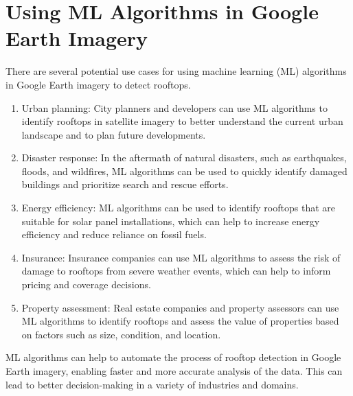 \section{Using ML Algorithms in Google Earth Imagery}
There are several potential use cases for using machine learning (ML) algorithms in Google Earth imagery to detect rooftops.
\begin{enumerate}
    \item Urban planning: City planners and developers can use ML algorithms to identify rooftops in satellite imagery to better understand the current urban landscape and to plan future developments.
    \item Disaster response: In the aftermath of natural disasters, such as earthquakes, floods, and wildfires, ML algorithms can be used to quickly identify damaged buildings and prioritize search and rescue efforts.
    \item Energy efficiency: ML algorithms can be used to identify rooftops that are suitable for solar panel installations, which can help to increase energy efficiency and reduce reliance on fossil fuels.
    \item Insurance: Insurance companies can use ML algorithms to assess the risk of damage to rooftops from severe weather events, which can help to inform pricing and coverage decisions.
    \item Property assessment: Real estate companies and property assessors can use ML algorithms to identify rooftops and assess the value of properties based on factors such as size, condition, and location.
\end{enumerate}
ML algorithms can help to automate the process of rooftop detection in Google Earth imagery, enabling faster and more accurate analysis of the data. This can lead to better decision-making in a variety of industries and domains.

